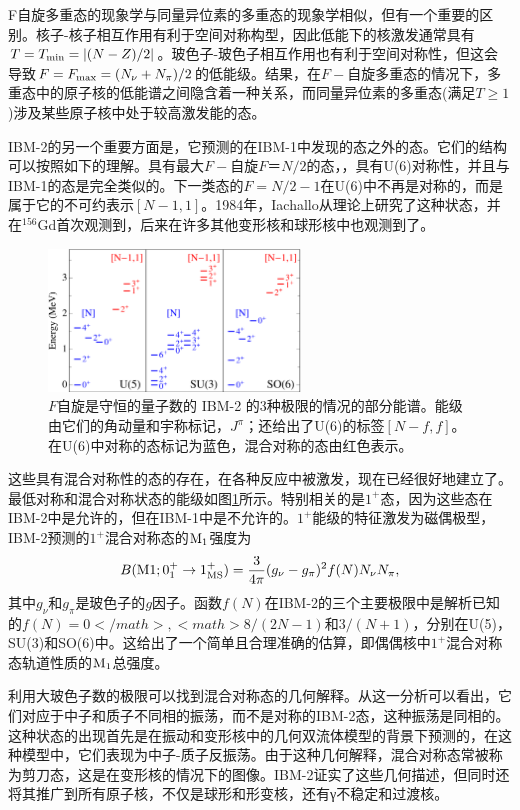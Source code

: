 F自旋多重态的现象学与同量异位素的多重态的现象学相似，但有一个重要的区别。核子-核子相互作用有利于空间对称构型，因此低能下的核激发通常具有$T=T_{\rm min}=|(N-Z)/2|$。玻色子-玻色子相互作用也有利于空间对称性，但这会导致$F=F_{\rm max}=(N_\nu+N_\pi)/2$的低能级。结果，在$F-$自旋多重态的情况下，多重态中的原子核的低能谱之间隐含着一种关系，而同量异位素的多重态(满足$T\ge1$)涉及某些原子核中处于较高激发能的态。

IBM-2的另一个重要方面是，它预测的在IBM-1中发现的态之外的态。它们的结构可以按照如下的理解。具有最大$F-$自旋$F＝N/2$的态，，具有U(6)对称性，并且与IBM-1的态是完全类似的。下一类态的$F=N/2-1$在U(6)中不再是对称的，而是属于它的不可约表示$[N-1,1]$。1984年，Iachallo从理论上研究了这种状态，并在${}^{156}$Gd首次观测到，后来在许多其他变形核和球形核中也观测到了。
\begin{figure}[H]
\centering
\includegraphics[width=0.6\textwidth]{figure/F_ms.png}
\caption{$F$自旋是守恒的量子数的 IBM-2 的3种极限的情况的部分能谱。能级由它们的角动量和宇称标记，$J^\pi$；还给出了U(6)的标签$[N-f,f]$。在U(6)中对称的态标记为蓝色，混合对称的态由红色表示。\label{fig_ms}}
\end{figure}


这些具有混合对称性的态的存在，在各种反应中被激发，现在已经很好地建立了。最低对称和混合对称状态的能级如图\ref{fig_ms}所示。特别相关的是$1^+$态，因为这些态在IBM-2中是允许的，但在IBM-1中是不允许的。$1^+$能级的特征激发为磁偶极型，IBM-2预测的$1^+$混合对称态的${\rm M_1}$强度为
\begin{equation*}
B({\rm M}1;0^+_1\rightarrow1^+_{\rm MS})=
{3\over{4\pi}}(g_\nu-g_\pi)^2f(N)N_\nu N_\pi,
\end{equation*}
其中$g_\nu$和$g_\pi$是玻色子的$g$因子。函数$f(N)$在IBM-2的三个主要极限中是解析已知的$f(N)=0</math>, <math>8/(2N-1)$和$3/(N+1)$，分别在U(5)，SU(3)和SO(6)中。这给出了一个简单且合理准确的估算，即偶偶核中$1^+$混合对称态轨道性质的${\rm M_1}$总强度。

利用大玻色子数的极限可以找到混合对称态的几何解释。从这一分析可以看出，它们对应于中子和质子不同相的振荡，而不是对称的IBM-2态，这种振荡是同相的。这种状态的出现首先是在振动和变形核中的几何双流体模型的背景下预测的，在这种模型中，它们表现为中子-质子反振荡。由于这种几何解释，混合对称态常被称为剪刀态，这是在变形核的情况下的图像。IBM-2证实了这些几何描述，但同时还将其推广到所有原子核，不仅是球形和形变核，还有γ不稳定和过渡核。

